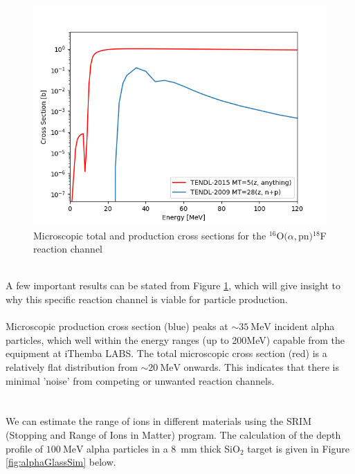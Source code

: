 \documentclass[]{article}
\begin{document}
\begin{figure}[h!]
	\includegraphics[width=12cm]{tendl.png}
	\centering
	\captionsetup{justification=centering,margin=2cm}
	\caption{ Microscopic total and production cross sections for the ${}^{16}$O$(\alpha,$pn$){}^{18}$F reaction channel\protect\cite{crossSectionPIC}}
	\label{fig:CrossSectionFromProposal}
\end{figure}~\\
A few important results can be stated from Figure \ref{fig:CrossSectionFromProposal}, which will give insight to why this specific reaction channel is viable for particle production.\\\\
Microscopic production cross section (blue) peaks at $\sim \SI{35}{\mega \electronvolt}$ incident alpha particles, which well within the energy ranges (up to 200MeV) capable from the equipment at iThemba LABS. The total microscopic cross section (red) is a relatively flat distribution from $\sim \SI{20}{\mega \electronvolt}$ onwards. This indicates that there is minimal 'noise' from competing or unwanted reaction channels. \\\\
~\\
We can estimate the range of ions in different materials using the SRIM (Stopping and Range of Ions in Matter) program\cite{alphaGlassSimulation}. The calculation of the depth profile of $\SI{100}{\mega \electronvolt}$ alpha particles in a \SI{8}{\milli \metre} thick SiO$_2$ target is given in Figure \ref{fig:alphaGlassSim} below. 
\end{document}
